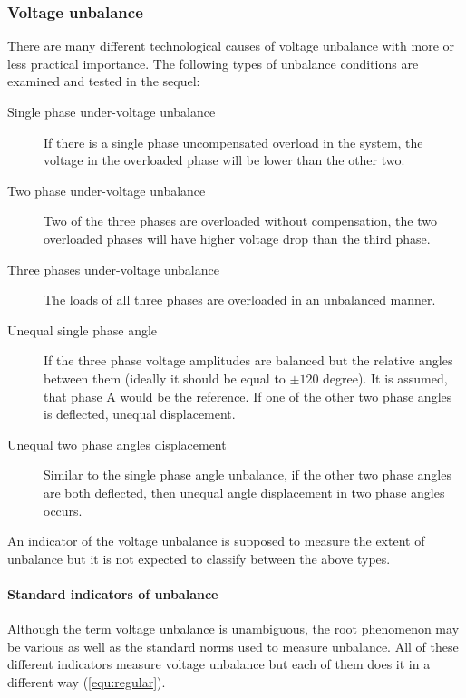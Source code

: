 \subsubsection{Voltage unbalance}

        There are many different technological causes of voltage unbalance with more or less practical importance. The following types of unbalance conditions are examined and tested in the sequel:
        \begin{description}
        \item[Single phase under-voltage unbalance]  If there is a single phase uncompensated overload in the system, the voltage in the overloaded phase will be lower than the other two.
        \item[Two phase under-voltage unbalance]  Two of the three phases are overloaded without compensation, the two overloaded phases will have higher voltage drop than the third phase.
        \item[Three phases under-voltage unbalance]  The loads of all three phases are overloaded in an unbalanced manner.
        \item[Unequal single phase angle]  If the three phase voltage amplitudes are balanced but the relative angles between them (ideally it should be equal to $\pm120$ degree). It is assumed, that phase A would be the reference. If one of the other two phase angles is deflected, unequal displacement.
        \item[Unequal two phase angles displacement] Similar to the single phase angle unbalance, if the other two phase angles are both deflected, then unequal angle displacement in two phase angles occurs.
        \end{description}
        An indicator of the voltage unbalance is supposed to measure the extent of unbalance but it is not expected to classify between the above types.

        \paragraph{Standard indicators of unbalance}

            Although the term voltage unbalance is unambiguous, the root phenomenon may be various as well as the standard norms used to measure unbalance. All of these different indicators measure voltage unbalance but each of them does it in a different way (\ref{equ:regular}).


